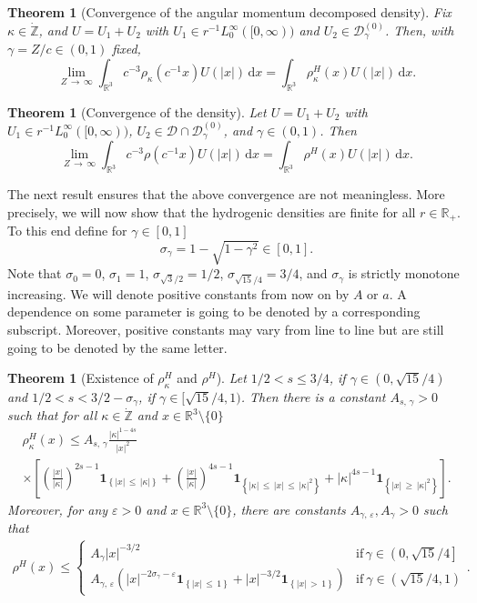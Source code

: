 \documentclass[10pt]{amsart}
\newtheorem{theo}[cdrthm]{Theorem}
\theoremstyle{definition}
\newcommand*\rd{\mathrm{d}}
\newcommand*\dx{\mathrm{d}x}
\newcommand*\gz{\mathbb{Z}}
\newcommand*\rz{\mathbb{R}}
\newcommand*\zp{\dot{\gz}}
\newcommand{\one}{\mathbf{1}}
\newcommand*\cD{\mathcal{D}}
\begin{document}
\begin{theo}[Convergence of the angular momentum decomposed density]\label{convfixedl}
Fix $\kappa\in\zp$, and $U=U_1+U_2$ with $U_1\in r^{-1}L^\infty_0 ([0,\infty))$ and $U_2\in\cD_\gamma^{(0)}$. Then, with $\gamma=Z/c\in(0,1)$ fixed,
\[
\lim_{Z\,\to\,\infty}\int_{\rz^3} c^{-3}\rho_{\kappa}\left(c^{-1}x\right)U(|x|)\,\rd x = \int_{\rz^3}\rho_{\kappa}^H(x)U(|x|)\,\rd x.
\]
\end{theo}

\begin{theo}[Convergence of the density]\label{convalll}
Let $U=U_1+U_2$ with $U_1\in r^{-1}L^\infty_0 ([0,\infty))$, $U_2\in\cD\cap\cD_\gamma^{(0)}$, and $\gamma\in(0,1)$. Then
\[
\lim_{Z\,\to\,\infty}\int_{\rz^3} c^{-3}\rho\left(c^{-1}x\right)U(|x|)\,\dx = \int_{\rz^3} \rho^H(x)U(|x|)\,\dx.
\]
\end{theo}


The next result ensures that the above convergence are not meaningless. More precisely, we will now show that the hydrogenic densities are finite for all $r\in\rz_+$. To this end define for $\gamma\in[0,1]$
\begin{equation}\label{eq:defsigmagamma}
\sigma_\gamma = 1-\sqrt{1-\gamma^2}\in[0,1].
\end{equation}
Note that $\sigma_0=0$, $\sigma_1=1$, $\sigma_{\sqrt3/2}=1/2$, $\sigma_{\sqrt{15}/4}=3/4$, and $\sigma_\gamma$ is strictly monotone increasing. We will denote positive constants from now on by $A$ or $a$. A dependence on some parameter is going to be denoted by a corresponding subscript. Moreover, positive constants may vary from line to line but are still going to be denoted by the same letter.

\begin{theo}[Existence of $\rho_\kappa^H$ and $\rho^H$]\label{existencerhoh}
Let $1/2<s\leq3/4$, if $\gamma\in(0,\sqrt{15}/4)$ and $1/2<s<3/2-\sigma_\gamma$, if $\gamma\in[\sqrt{15}/4,1)$. Then there is a constant $A_{s,\,\gamma}>0$ such that for all $\kappa\in\zp$ and $x\in\rz^3\setminus\{0\}$
\begin{multline*}
\rho_{\kappa}^H(x)
\leq A_{s,\,\gamma} \frac{|\kappa|^{1-4s}}{|x|^2}\\
\times\left[\left(\frac{|x|}{|\kappa|}\right)^{2s-1}\one_{\left\{|x|\,\leq\,|\kappa|\right\}}+\left(\frac{|x|}{|\kappa|}\right)^{4s-1}\one_{\left\{|\kappa|\,\leq\,|x|\,\leq\,|\kappa|^2\right\}} + |\kappa|^{4s-1}\one_{\left\{|x|\,\geq\,|\kappa|^2\right\}}\right].
\end{multline*}
Moreover, for any $\varepsilon>0$ and $x\in\rz^3\setminus\{0\}$, there are constants $A_{\gamma,\,\varepsilon},A_\gamma>0$ such that
\begin{align}\label{eq:boundrhoh}
\rho^H(x)\leq
\begin{cases}
A_\gamma |x|^{-3/2} & \text{if}\, \gamma\in\left(0,\sqrt{15}/4\right]\\
A_{\gamma,\,\varepsilon}\left(|x|^{-2\sigma_\gamma-\varepsilon}\one_{\left\{|x|\,\leq\,1\right\}} + |x|^{-3/2}\one_{\left\{|x|\,>\,1\right\}}\right) & \text{if}\ \gamma\in\left(\sqrt{15}/4,1\right)
\end{cases}.
\end{align}
\end{theo}
\end{document}
